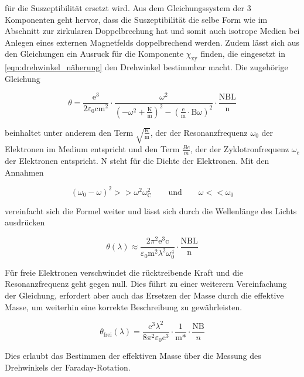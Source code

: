         für die Suszeptibilität ersetzt wird. Aus dem Gleichungssystem der 3 Komponenten geht hervor, dass die Suszeptibilität die selbe Form wie im Abschnitt zur zirkularen Doppelbrechung hat und somit auch 
        isotrope Medien bei Anlegen eines externen Magnetfelds doppelbrechend werden. Zudem lässt sich aus den Gleichungen ein Ausruck für die Komponente $\chi_{\text{xy}}$ finden, die eingesetzt in 
        \ref{eqn:drehwinkel_näherung} den Drehwinkel bestimmbar macht. Die zugehörige Gleichung

        \begin{equation*}
            \theta = \frac{\text{e}^3}{2\varepsilon_0\text{cm}^2} \cdot \frac{\omega^2}{\left(-\omega^2 + \frac{\text{K}}{\text{m}}\right)^2 - \left(\frac{\text{e}}{\text{m}} \cdot \text{B} \omega\right)^2} \cdot \frac{\text{NBL}}{\text{n}}
        \end{equation*}

        beinhaltet unter anderem den Term $\sqrt{\frac{\text{K}}{\text{m}}}$, der der Resonanzfrequenz $\omega_0$ der Elektronen im Medium entspricht und den Term $\frac{Be}{m}$, der der Zyklotronfrequenz 
        $\omega_{\text{c}}$ der Elektronen entspricht. N steht für die Dichte der Elektronen. Mit den Annahmen
        
        \begin{equation*}
            \left(\omega_0 - \omega\right)^2 >> \omega^2 \omega_{\text{C}}^2 \qquad \text{und} \qquad \omega << \omega_0
        \end{equation*}

        vereinfacht sich die Formel weiter und lässt sich durch die Wellenlänge des Lichts ausdrücken

        \begin{equation*}
            \theta(\lambda) \approx \frac{2\pi^2\text{e}^3\text{c}}{\varepsilon_0 \text{m}^2 \lambda^2 \omega_0^4} \cdot \frac{\text{NBL}}{\text{n}}
        \end{equation*}

        Für freie Elektronen verschwindet die rücktreibende Kraft und die Resonanzfrequenz geht gegen null. Dies führt zu einer weiterern Vereinfachung der Gleichung, erfordert aber auch das Ersetzen der Masse
        durch die effektive Masse, um weiterhin eine korrekte Beschreibung zu gewährleisten.

        \begin{equation}
            \theta_{\text{frei}}(\lambda) = \frac{\text{e}^3 \lambda^2}{8\pi^2\varepsilon_0 \text{c}^3} \cdot \frac{1}{\text{m*}} \cdot \frac{\text{NB}}{n}
        \end{equation}

        Dies erlaubt das Bestimmen der effektiven Masse über die Messung des Drehwinkels der Faraday-Rotation.



        